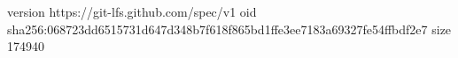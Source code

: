 version https://git-lfs.github.com/spec/v1
oid sha256:068723dd6515731d647d348b7f618f865bd1ffe3ee7183a69327fe54ffbdf2e7
size 174940
